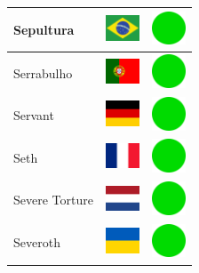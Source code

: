 \documentclass[12pt, a4paper, twoside]{report}
\begin{document}
\begin{center}
\begin{longtable}{|p{5cm}|p{2cm}|p{2cm}|}
 Sepultura                                                  & \includegraphics[width=1cm]{../img/flags/br} &   \includegraphics[width=1cm]{../likes/y} \\ \hline
 Serrabulho                                                 & \includegraphics[width=1cm]{../img/flags/pt} &   \includegraphics[width=1cm]{../likes/y} \\ \hline
 Servant                                                    & \includegraphics[width=1cm]{../img/flags/de} &   \includegraphics[width=1cm]{../likes/y} \\ \hline
 Seth                                                       & \includegraphics[width=1cm]{../img/flags/fr} &   \includegraphics[width=1cm]{../likes/y} \\ \hline
 Severe Torture                                             & \includegraphics[width=1cm]{../img/flags/nl} &   \includegraphics[width=1cm]{../likes/y} \\ \hline
 Severoth                                                   & \includegraphics[width=1cm]{../img/flags/ua} &   \includegraphics[width=1cm]{../likes/y} \\ \hline

\end{longtable}
\end{center}
\end{document}
